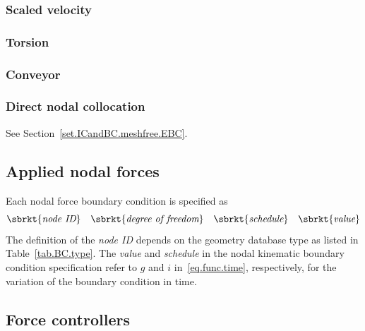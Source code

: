 \subsubsection{Scaled velocity}
\subsubsection{Torsion}
\subsubsection{Conveyor}
\subsubsection{Direct nodal collocation}
See Section~\ref{set.ICandBC.meshfree.EBC}.

\subsection{Applied nodal forces}
\label{set.ICandBC.FBC}
Each nodal force boundary condition is specified as
\[
\sbrkt{\textit{node ID}} \quad 
\sbrkt{\textit{degree of freedom}} \quad
\sbrkt{\textit{schedule}} \quad
\sbrkt{\textit{value}}
\]
The definition of the \textit{node ID} depends on the geometry 
database type as listed in Table~\ref{tab.BC.type}. 
The \textit{value} and \textit{schedule} in the nodal kinematic 
boundary condition specification refer to 
$g$ and $i$ in~\eqref{eq.func.time}, respectively, for the variation 
of the boundary condition in time.

\subsection{Force controllers}
\label{set.ICandBC.FBC.controller}

